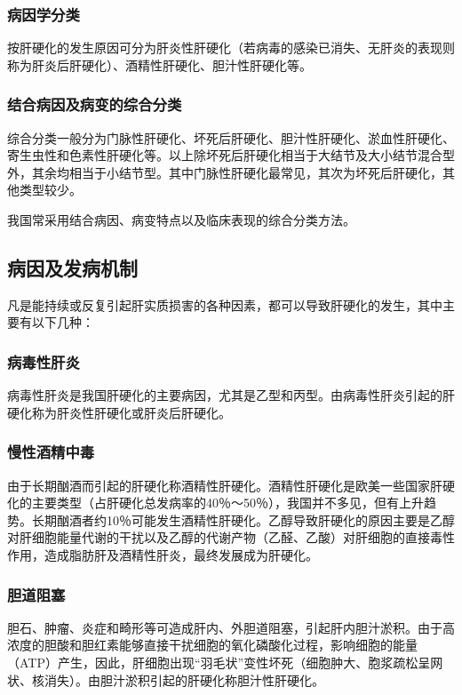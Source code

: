 \subsubsection{病因学分类}

按肝硬化的发生原因可分为肝炎性肝硬化（若病毒的感染已消失、无肝炎的表现则称为肝炎后肝硬化）、酒精性肝硬化、胆汁性肝硬化等。

\subsubsection{结合病因及病变的综合分类}

综合分类一般分为门脉性肝硬化、坏死后肝硬化、胆汁性肝硬化、淤血性肝硬化、寄生虫性和色素性肝硬化等。以上除坏死后肝硬化相当于大结节及大小结节混合型外，其余均相当于小结节型。其中门脉性肝硬化最常见，其次为坏死后肝硬化，其他类型较少。

我国常采用结合病因、病变特点以及临床表现的综合分类方法。

\subsection{病因及发病机制}

凡是能持续或反复引起肝实质损害的各种因素，都可以导致肝硬化的发生，其中主要有以下几种：

\subsubsection{病毒性肝炎}

病毒性肝炎是我国肝硬化的主要病因，尤其是乙型和丙型。由病毒性肝炎引起的肝硬化称为肝炎性肝硬化或肝炎后肝硬化。

\subsubsection{慢性酒精中毒}

由于长期酗酒而引起的肝硬化称酒精性肝硬化。酒精性肝硬化是欧美一些国家肝硬化的主要类型（占肝硬化总发病率的40％～50％），我国并不多见，但有上升趋势。长期酗酒者约10％可能发生酒精性肝硬化。乙醇导致肝硬化的原因主要是乙醇对肝细胞能量代谢的干扰以及乙醇的代谢产物（乙醛、乙酸）对肝细胞的直接毒性作用，造成脂肪肝及酒精性肝炎，最终发展成为肝硬化。

\subsubsection{胆道阻塞}

胆石、肿瘤、炎症和畸形等可造成肝内、外胆道阻塞，引起肝内胆汁淤积。由于高浓度的胆酸和胆红素能够直接干扰细胞的氧化磷酸化过程，影响细胞的能量（ATP）产生，因此，肝细胞出现“羽毛状”变性坏死（细胞肿大、胞浆疏松呈网状、核消失）。由胆汁淤积引起的肝硬化称胆汁性肝硬化。


